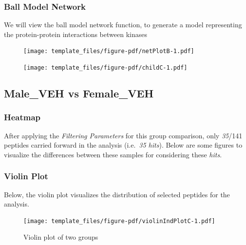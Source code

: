 \documentclass[
  letterpaper,
  DIV=11,
  numbers=noendperiod]{scrreport}
\begin{document}
\hypertarget{ball-model-network-1}{%
\subsubsection{Ball Model Network}\label{ball-model-network-1}}

We will view the ball model network function, to generate a model
representing the protein-protein interactions between kinases

\begin{figure}[htbp]

{\centering \texttt{[image: template\_files/figure-pdf/netPlotB-1.pdf]}

}

\end{figure}

\newpage

\begin{figure}[htbp]

{\centering \texttt{[image: template\_files/figure-pdf/childC-1.pdf]}

}

\end{figure}

\hypertarget{male_veh-vs-female_veh}{%
\subsection{Male\_VEH vs Female\_VEH}\label{male_veh-vs-female_veh}}

\hypertarget{heatmap-2}{%
\subsubsection{Heatmap}\label{heatmap-2}}

After applying the \emph{Filtering Parameters} for this group
comparison, only \emph{35}/141 peptides carried forward in the analysis
(i.e.~\emph{35 hits}). Below are some figures to visualize the
differences between these samples for considering these \emph{hits}.

\hypertarget{violin-plot-2}{%
\subsubsection{Violin Plot}\label{violin-plot-2}}

Below, the violin plot visualizes the distribution of selected peptides
for the analysis.

\begin{figure}[htbp]

{\centering \texttt{[image: template\_files/figure-pdf/violinIndPlotC-1.pdf]}

}

\caption{Violin plot of two groups}

\end{figure}
\end{document}
